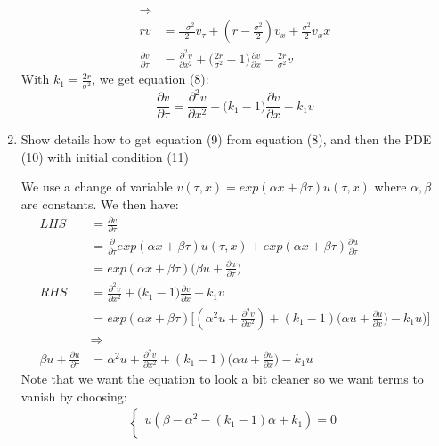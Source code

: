 \documentclass[12pt,twoside, letter]{exam}
\theoremstyle{definition}
\begin{document}
\begin{enumerate}
\begin{solution}
\begin{align*}
          \Rightarrow \\
          rv &= \frac{-\sigma^2}{2} v_\tau + (r - \frac{\sigma^2}{2}) v_x + \frac{\sigma^2}{2} v_xx\\
          \frac{\partial v}{\partial \tau} &= \frac{\partial^2 v}{\partial x^2}
          + \bigg(\frac{2r}{\sigma^2} - 1\bigg)\frac{\partial v}{\partial x} - \frac{2r}{\sigma^2}v
        \end{align*}
        With $k_1 = \frac{2r}{\sigma^2}$, we get equation (8):
        \begin{equation*}
        \frac{\partial v}{\partial \tau} = \frac{\partial^2 v}{\partial x^2}
        + \bigg(k_1 - 1\bigg)\frac{\partial v}{\partial x} - k_1v
        \end{equation*}
      \end{solution}
  \item Show details how to get equation (9) from equation (8), and then the PDE (10) with initial condition (11)
    \begin{solution}
      We use a change of variable $v(\tau, x) = exp(\alpha x + \beta \tau)u(\tau, x)$ where $\alpha, \beta$ are constants.
      We then have:
      \begin{align*}
        LHS &= \frac{\partial v}{\partial \tau} \\
        &= \frac{\partial}{\partial \tau}exp(\alpha x + \beta \tau)u(\tau, x)
        + exp(\alpha x + \beta \tau)\frac{\partial u}{\partial \tau} \\
        &= exp(\alpha x + \beta \tau)\bigg(\beta u + \frac{\partial u}{\partial \tau} \bigg) \\
        RHS &= \frac{\partial^2 v}{\partial x^2} + \bigg(k_1 - 1\bigg)\frac{\partial v}{\partial x} - k_1v \\
        &= exp(\alpha x + \beta \tau)\bigg[(\alpha^2u + \frac{\partial^2 v}{\partial x^2}) + (k_1 - 1)
        \big(\alpha u + \frac{\partial u}{\partial x} \big) - k_1 u
        \big)\bigg] \\
        &\Rightarrow \\
        \beta u + \frac{\partial u}{\partial \tau} &= \alpha^2u + \frac{\partial^2 v}{\partial x^2} + (k_1 - 1)
        \big(\alpha u + \frac{\partial u}{\partial x} \big) - k_1 u
      \end{align*}
        Note that we want the equation to look a bit cleaner so we want terms to vanish by choosing:
        \begin{align}
          \begin{cases}
            u(\beta - \alpha^2 - (k_1 - 1)\alpha + k_1) = 0 \\

\end{cases}
\end{align}
\end{solution}
\end{enumerate}
\end{document}
